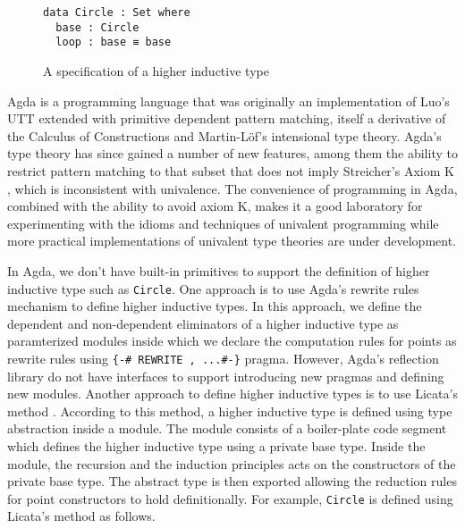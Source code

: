 \documentclass[sigplan,10pt]{acmart}
\begin{document}
\begin{figure}[h]
\begin{center}
\begin{BVerbatim}
data Circle : Set where
  base : Circle
  loop : base ≡ base
\end{BVerbatim}
\end{center}
\caption{A specification of a higher inductive type}
\label{fig:circle}
\end{figure}


Agda  is a programming language that was originally an implementation of Luo's UTT  extended with primitive dependent pattern matching, itself a derivative of the Calculus of Constructions and Martin-Löf's intensional type theory.
Agda's type theory has since gained a number of new features, among them the ability to restrict pattern matching to that subset that does not imply Streicher's Axiom K , which is inconsistent with univalence.
The convenience of programming in Agda, combined with the ability to avoid axiom K, makes it a good laboratory for experimenting with the idioms and techniques of univalent programming while more practical implementations of univalent type theories are under development.

In Agda, we don't have built-in primitives to support the definition of higher inductive type such as {\tt Circle}. One approach is to use Agda's rewrite rules  mechanism to define higher inductive types. In this approach, we define the dependent and non-dependent eliminators of a higher inductive type as paramterized modules inside which we declare the computation rules for points as rewrite rules using \Verb|{-# REWRITE , ...#-}| pragma. However, Agda's reflection library do not have interfaces to support introducing new pragmas and defining new modules. Another approach to define higher inductive types is to use Licata's method \cite{Licata-2011}. According to this method, a higher inductive type is defined using type abstraction inside a module. The module consists of a boiler-plate code segment which defines the higher inductive type using a private base type. Inside the module, the recursion and the induction principles acts on the constructors of the private base type. The abstract type is then exported allowing the reduction rules for point constructors to hold definitionally. For example, {\tt Circle} is defined using Licata's method as follows.
\end{document}
